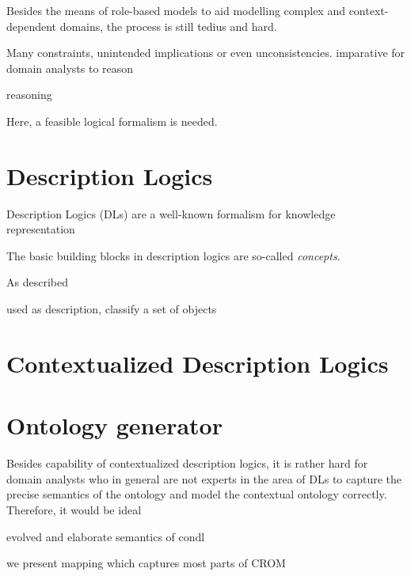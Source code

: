 Besides the means of role-based models to aid modelling complex and context-dependent
domains, the process is still tedius and hard. 

Many constraints, unintended implications or even unconsistencies. imparative for domain analysts to reason

reasoning

Here, a feasible logical formalism is needed.

\section{Description Logics}
\label{sec:intro-description-logics}

Description Logics (DLs) are a well-known formalism for knowledge representation



The basic building blocks in description logics are so-called \emph{concepts}. 

As described

used as description, classify a set of objects

\section{Contextualized Description Logics}
\label{sec:intro-contextualized-description-logics}


\blindtext

\section{Ontology generator}
\label{sec:zweite-section}

Besides capability of contextualized description logics, it is rather hard for domain analysts who
in general are not experts in the area of DLs to capture the precise semantics of the ontology and model the
contextual ontology correctly. Therefore, it would be ideal 

evolved and elaborate semantics of condl

we present mapping which captures most parts of CROM

